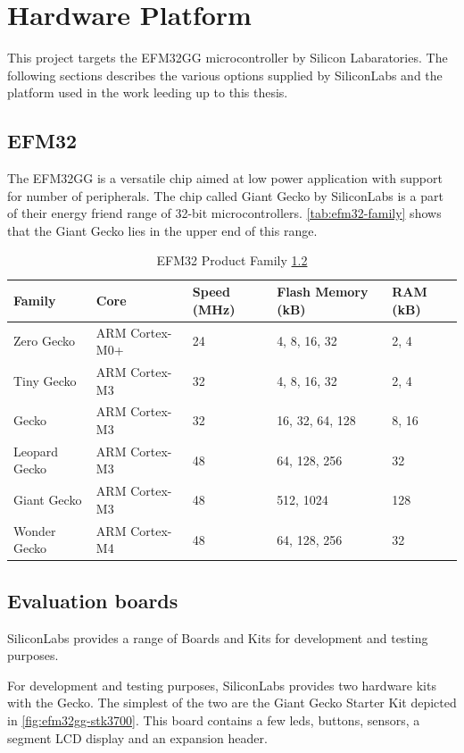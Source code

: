 \section{Hardware Platform}
\label{sec:back:hw}

This project targets the EFM32GG microcontroller by Silicon Labaratories.
The following sections describes the various options supplied by SiliconLabs and the platform used in the work leeding up to this thesis.

\subsection{EFM32}
The EFM32GG is a versatile chip aimed at low power application with support for number of peripherals.
The chip called Giant Gecko by SiliconLabs is a part of their energy friend range of 32-bit microcontrollers.
\autoref{tab:efm32-family} shows that the Giant Gecko lies in the upper end of this range.

\begin{table}[H]
  \centering
  \begin{tabular}{|l|l|l|l|l|}
    \hline
    Family & Core & Speed (MHz) & Flash Memory (kB) & RAM (kB) \\
    \hline
    Zero Gecko & ARM Cortex-M0+ & 24 & 4, 8, 16, 32 & 2, 4 \\
    Tiny Gecko & ARM Cortex-M3 & 32 & 4, 8, 16, 32 & 2, 4 \\
    Gecko & ARM Cortex-M3 & 32 & 16, 32, 64, 128 & 8, 16 \\
    Leopard Gecko & ARM Cortex-M3 & 48 & 64, 128, 256 & 32 \\
    Giant Gecko & ARM Cortex-M3 & 48 & 512, 1024 & 128 \\
    Wonder Gecko & ARM Cortex-M4 & 48 & 64, 128, 256 & 32 \\
    \hline
  \end{tabular}
  \caption{EFM32 Product Family \ref{} }
  \label{tab:efm32-family}
\end{table}

\subsection{Evaluation boards}

SiliconLabs provides a range of Boards and Kits for development and testing purposes.

For development and testing purposes, SiliconLabs provides two hardware kits with the Gecko.
The simplest of the two are the Giant Gecko Starter Kit depicted in \autoref{fig:efm32gg-stk3700}.
This board contains a few leds, buttons, sensors, a segment LCD display and an expansion header.

